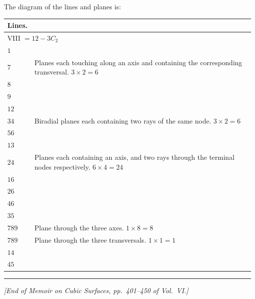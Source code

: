 \documentclass[11pt,a4paper]{article}
\begin{document}
The diagram of the lines and planes is:

\begin{center}
\begin{tabular}{ll}
\textbf{Lines.} & \\
\midrule
\multicolumn{2}{l}{VIII $= 12 - 3C_2$} \\
$1$ & \\
$7$ & Planes each touching along an axis and containing the corresponding transversal. $3 \times 2 = 6$ \\
$8$ & \\
$9$ & \\
$12$ & \\
$34$ & Biradial planes each containing two rays of the same node. $3 \times 2 = 6$ \\
$56$ & \\
$13$ & \\
$24$ & Planes each containing an axis, and two rays through the terminal nodes respectively. $6 \times 4 = 24$ \\
$16$ & \\
$26$ & \\
$46$ & \\
$35$ & \\
$789$ & Plane through the three axes. $1 \times 8 = 8$ \\
$789$ & Plane through the three transversals. $1 \times 1 = 1$ \\
$14$ & \\
$45$ &
\end{tabular}
\end{center}

\bigskip

\noindent\rule{\textwidth}{0.4pt}

\begin{center}
\textit{[End of Memoir on Cubic Surfaces, pp.~401--450 of Vol.~VI.]}
\end{center}
\end{document}
